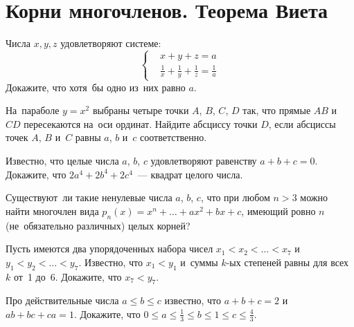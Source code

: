 
\section*{Корни многочленов. Теорема Виета}



\begin{problems}

\item
Числа $x, y, z$ удовлетворяют системе:
\[ \left\{ \begin{aligned} &
    x  + y  + z  = a
\\ &
    \frac{1}{x} + \frac{1}{y} + \frac{1}{z} = \frac{1}{a}
\end{aligned} \right. \]
Докажите, что хотя~бы одно из~них равно $a$.

\item
На~параболе $y = x^2$ выбраны четыре точки $A$, $B$, $C$, $D$ так, что прямые
$AB$ и~$CD$ пересекаются на~оси ординат.
Найдите абсциссу точки $D$, если абсциссы точек $A$, $B$ и~$C$ равны
$a$, $b$ и~$c$ соответственно.

\item
Известно, что целые числа $a$, $b$, $c$ удовлетворяют равенству
$a + b + c = 0$.
Докажите, что $2 a^4 + 2 b^4 + 2 c^4$~--- квадрат целого числа.

\item
Существуют~ли такие ненулевые числа $a$, $b$, $c$, что при любом $n > 3$ можно
найти многочлен вида $p_n(x) = x^n + \ldots + a x^2 + b x + c$, имеющий ровно
$n$ (не~обязательно различных) целых корней?


\item
Пусть имеются два упорядоченных набора чисел $x_1 < x_2 < \ldots < x_7$
и~$y_1 < y_2 < \ldots < y_7$.
Известно, что $x_1 < y_1$ и~суммы $k$-ых степеней равны для всех $k$ от~1 до~6.
Докажите, что $x_7 < y_7$.


\item
Про действительные числа $a \leq b \leq c$ известно, что $a + b + c = 2$
и~$a b + b c + c a = 1$.
Докажите, что
$0 \leq a \leq \frac{1}{3} \leq b \leq 1 \leq c \leq \frac{4}{3}$.

\end{problems}

